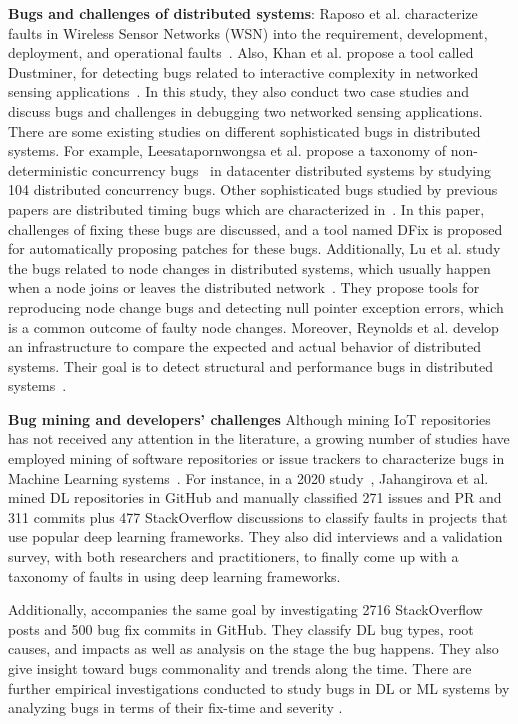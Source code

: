\textbf{Bugs and challenges of distributed systems}: Raposo et al. characterize faults in Wireless Sensor Networks (WSN) into the requirement, development, deployment, and operational faults~\cite{raposo2017taxonomy}. Also, Khan et al. propose a tool called Dustminer, for detecting bugs related to interactive complexity in networked sensing applications~\cite{khan2008dustminer}. In this study, they also conduct two case studies and discuss bugs and challenges in debugging two networked sensing applications. There are some existing studies on different sophisticated bugs in distributed systems. For example, Leesatapornwongsa et al. propose a taxonomy of non-deterministic concurrency bugs~\cite{leesatapornwongsa2016taxdc} in datacenter distributed systems by studying 104 distributed concurrency bugs. Other sophisticated bugs studied by previous papers are distributed timing bugs which are characterized in~\cite{li2019dfix}. In this paper, challenges of fixing these bugs are discussed, and a tool named DFix is proposed for automatically proposing patches for these bugs. Additionally, Lu et al. study the bugs related to node changes in distributed systems, which usually happen when a node joins or leaves the distributed network~\cite{lu2019understanding}. They propose tools for reproducing node change bugs and detecting null pointer exception errors, which is a common outcome of faulty node changes. Moreover, Reynolds et al. develop an infrastructure to compare the expected and actual behavior of distributed systems. Their goal is to detect structural and performance bugs in distributed systems~\cite{reynolds2006pip}. 

\textbf{Bug mining and developers' challenges}
Although mining IoT repositories has not received any attention in the literature, a growing number of studies have employed mining of software repositories or issue trackers to characterize bugs in Machine Learning systems~\cite{DlTaxFaults,zhangempiricalDL2020ICSE,islam2019comprehensive, TensorFBugsISSTA}. For instance, in a 2020 study~\cite{DlTaxFaults}, Jahangirova et al. mined DL repositories in GitHub and manually classified 271 issues and PR and 311 commits plus 477 StackOverflow discussions to classify faults in projects that use popular deep learning frameworks. They also did interviews and a validation survey, with both researchers and practitioners, to finally come up with a taxonomy of faults in using deep learning frameworks.

Additionally, \cite{islam2019comprehensive} accompanies the same goal by investigating 2716 StackOverflow posts and 500 bug fix commits in GitHub. They classify DL bug types, root causes, and impacts as well as analysis on the stage the bug happens. They also give insight toward bugs commonality and trends along the time. There are further empirical investigations conducted to study bugs in DL or ML systems by analyzing bugs in terms of their fix-time and severity\cite{MLrealBugs} \cite{FerdianMLBugs} \cite{TensorFBugsISSTA}. 


